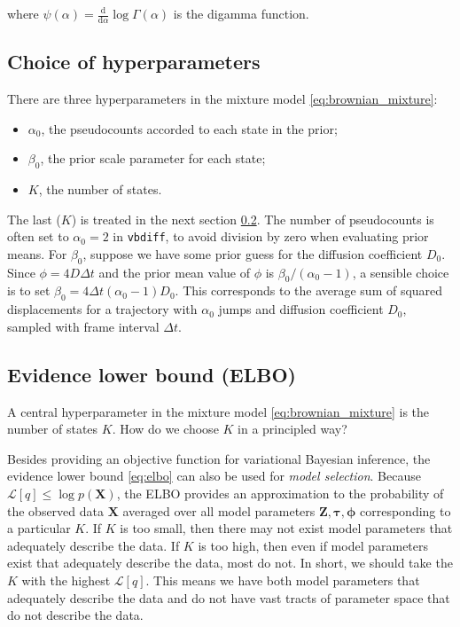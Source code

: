\documentclass{article}
\newcommand{\D}{\text{d}}
\let\vec\boldsymbol
\begin{document}
where $\psi(\alpha) = \frac{\D}{\D \alpha} \log \Gamma (\alpha)$ is the digamma function.

\subsection{Choice of hyperparameters}

There are three hyperparameters in the mixture model \ref{eq:brownian_mixture}:
\begin{itemize}
    \item $\alpha_{0}$, the pseudocounts accorded to each state in the prior;
    \item $\beta_{0}$, the prior scale parameter for each state;
    \item $K$, the number of states.
\end{itemize}

The last ($K$) is treated in the next section \ref{subsection:elbo}. The number of pseudocounts is often set to $\alpha_{0} = 2$ in \verb|vbdiff|, to avoid division by zero when evaluating prior means. For $\beta_{0}$, suppose we have some prior guess for the diffusion coefficient $D_{0}$. Since $\phi = 4 D \Delta t$ and the prior mean value of $\phi$ is $\beta_{0} / (\alpha_{0} - 1)$, a sensible choice is to set $\beta_{0} = 4 \Delta t (\alpha_{0} - 1) D_{0}$. This corresponds to the average sum of squared displacements for a trajectory with $\alpha_{0}$ jumps and diffusion coefficient $D_{0}$, sampled with frame interval $\Delta t$.

\subsection{Evidence lower bound (ELBO)}\label{subsection:elbo}

A central hyperparameter in the mixture model \ref{eq:brownian_mixture} is the number of states $K$. How do we choose $K$ in a principled way? \newline

Besides providing an objective function for variational Bayesian inference,
the evidence lower bound \ref{eq:elbo} can also be used for \emph{model selection}. Because $\mathcal{L}[q] \leq \log p \left( \vec{X} \right)$, the ELBO provides an approximation to the probability of the observed data $\vec{X}$ averaged over all model parameters $\vec{Z}, \boldsymbol{\tau}, \boldsymbol{\phi}$ corresponding to a particular $K$. If $K$ is too small, then there may not exist model parameters that adequately describe the data. If $K$ is too high, then even if model parameters exist that adequately describe the data, most do not. In short, we should take the $K$ with the highest $\mathcal{L}[q]$. This means we have both model parameters that adequately describe the data and do not have vast tracts of parameter space that do not describe the data. \newline
\end{document}
